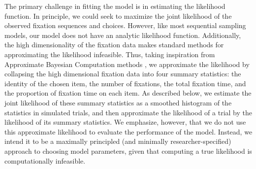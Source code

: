 The primary challenge in fitting the model is in estimating the likelihood function. In principle, we could seek to maximize the joint likelihood of the observed fixation sequences and choices. However, like most sequential sampling models, our model does not have an analytic likelihood function. Additionally, the high dimensionality of the fixation data makes standard methods for approximating the likelihood \citep{turner2014generalized,opheusden2020unbiased} infeasible. Thus, taking inspiration from Approximate Bayesian Computation methods \citep{sunnaker2013approximate,csillery2010approximate}, we approximate the likelihood by collapsing the high dimensional fixation data into four summary statistics: the identity of the chosen item, the number of fixations, the total fixation time, and the proportion of fixation time on each item. As described below, we estimate the joint likelihood of these summary statistics as a smoothed histogram of the statistics in simulated trials, and then approximate the likelihood of a trial by the likelihood of its summary statistics. We emphasize, however, that we do not use this approximate likelihood to evaluate the performance of the model. Instead, we intend it to be a maximally principled (and minimally researcher-specified) approach to choosing model parameters, given that computing a true likelihood is computationally infeasible.


